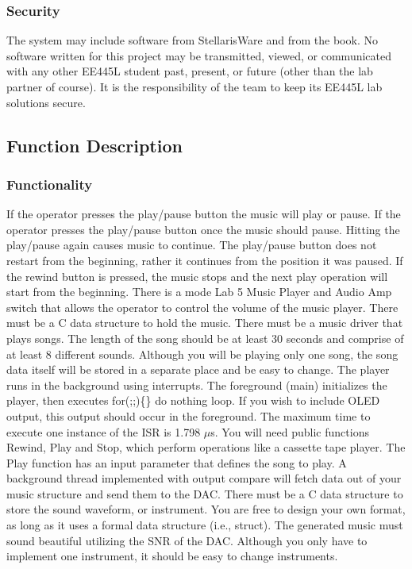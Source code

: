 \documentclass[twoside]{article}
\begin{document}
\subsubsection*{Security} 
The system may include software from StellarisWare and from the book. No software written for this project may be transmitted, viewed, or communicated with any other EE445L student past, present, or future (other than the lab partner of course). It is the responsibility of the team to keep its EE445L lab solutions secure. 
 
\subsection*{Function Description} 
\subsubsection*{Functionality} 
If the operator presses the play/pause button the music will play or pause. If the operator presses the play/pause button once the music should pause. Hitting the play/pause again causes music to continue. The play/pause button does not restart from the beginning, rather it continues from the position it was paused. If the rewind button is pressed, the music stops and the next play operation will start from the beginning. There is a mode Lab 5 Music Player and Audio Amp switch that allows the operator to control the volume of the music player. There must be a C data structure to hold the music. There must be a music driver that plays songs. The length of the song should be at least 30 seconds and comprise of at least 8 different sounds. Although you will be playing only one song, the song data itself will be stored in a separate place and be easy to change. The player runs in the background using interrupts. The foreground (main) initializes the player, then executes for(;;)\{\} do nothing loop. If you wish to include OLED output, this output should occur in the foreground. The maximum time to execute one instance of the ISR is 1.798 $\mu$s. You will need public functions Rewind, Play and Stop, which perform operations like a cassette tape player. The Play function has an input parameter that defines the song to play. A background thread implemented with output compare will fetch data out of your music structure and send them to the DAC. There must be a C data structure to store the sound waveform, or instrument. You are free to design your own format, as long as it uses a formal data structure (i.e., struct). The generated music must sound beautiful utilizing the SNR of the DAC. Although you only have to implement one instrument, it should be easy to change instruments. 
 
\end{document}
